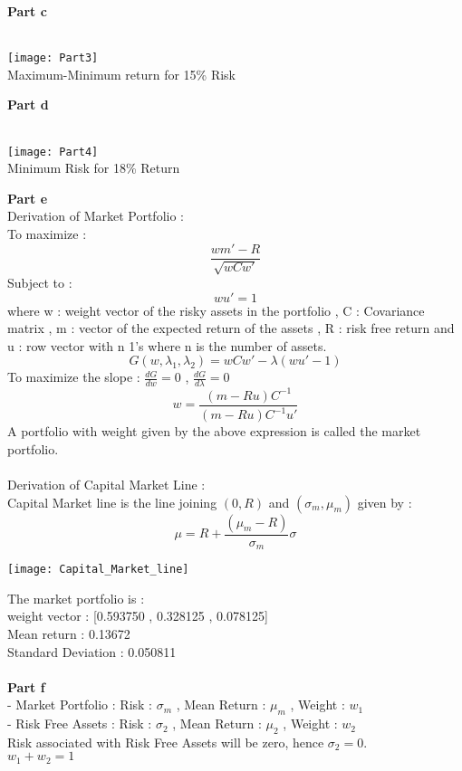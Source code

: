 \documentclass{article}
\begin{document}
\textbf{Part c}\\\\
\begin{center}
\texttt{[image: Part3]}\\
Maximum-Minimum return for 15\% Risk
\end{center}
\newpage
\textbf{Part d}\\\\
\begin{center}
\texttt{[image: Part4]}\\
Minimum Risk for 18\% Return
\end{center}

\textbf{Part e}\\
Derivation of Market Portfolio :\\  
To maximize :
$$\frac{wm' - R}{\sqrt{wCw'}}$$
Subject to :
$$wu' = 1$$
where w : weight vector of the risky assets in the portfolio , C : Covariance matrix , m : vector of the expected return of the assets , R : risk free return and u : row vector with n 1's where n is the number of assets.
$$G(w,\lambda_{1},\lambda_{2}) = wCw' - \lambda(wu' - 1)$$
To maximize the slope : $\frac{dG}{dw} = 0$ , $\frac{dG}{d\lambda} = 0$
$$w = \frac{(m-Ru)C^{-1}}{(m-Ru)C^{-1}u'}$$
A portfolio with weight given by the above expression is called the market portfolio. \\\\
Derivation of Capital Market Line :\\
Capital Market line is the line joining $(0,R)$ and $(\sigma_{m},\mu_{m})$ given by :
$$\mu = R + \frac{(\mu_{m}-R)}{\sigma_{m}}\sigma$$
\begin{center}
\texttt{[image: Capital\_Market\_line]}
\end{center}
The market portfolio is :\\
weight vector : [0.593750 , 0.328125 , 0.078125]\\
Mean return : 0.13672\\
Standard Deviation : 0.050811\\\\
\textbf{Part f}\\
- Market Portfolio : Risk : $\sigma_{m}$ , Mean Return : $\mu_{m}$ , Weight : $w_{1}$\\
- Risk Free Assets : Risk : $\sigma_{2}$ , Mean Return : $\mu_{2}$ , Weight : $w_{2}$\\
Risk associated with Risk Free Assets will be zero, hence $\sigma_{2} = 0$.\\
$w_{1} + w_{2} = 1$
\end{document}
